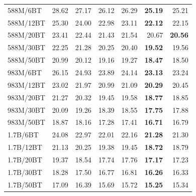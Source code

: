\begin{table}[t]
{\begin{tabular}{lrrrrrr}
    \midrule
    588M/6BT & 28.62 & 27.17 & 26.12 & 26.29 & \textbf{25.19} & 25.21 \\
    588M/12BT & 25.30 & 24.00 & 22.98 & 23.11 & \textbf{22.12} & 22.15 \\
    588M/20BT & 23.41 & 22.44 & 21.43 & 21.54 & 20.67 & \textbf{20.56} \\
    588M/30BT & 22.25 & 21.28 & 20.25 & 20.40 & \textbf{19.52} & 19.56 \\
    588M/50BT & 20.99 & 20.12 & 19.16 & 19.27 & \textbf{18.47} & 18.50 \\
    \midrule
    983M/6BT & 26.15 & 24.93 & 23.89 & 24.14 & \textbf{23.13} & 23.24 \\
    983M/12BT & 23.02 & 21.97 & 20.99 & 21.09 & \textbf{20.29} & 20.45 \\
    983M/20BT & 21.27 & 20.32 & 19.45 & 19.58 & \textbf{18.77} & 18.85 \\
    983M/30BT & 20.09 & 19.26 & 18.39 & 18.55 & \textbf{17.75} & 17.88 \\
    983M/50BT & 18.87 & 18.16 & 17.28 & 17.41 & \textbf{16.71} & 16.79 \\
    \midrule
    1.7B/6BT & 24.08 & 22.97 & 22.01 & 22.16 & \textbf{21.28} & 21.30 \\
    1.7B/12BT & 21.13 & 20.25 & 19.38 & 19.45 & \textbf{18.72} & 18.79 \\
    1.7B/20BT & 19.37 & 18.54 & 17.74 & 17.76 & \textbf{17.17} & 17.23 \\
    1.7B/30BT & 18.28 & 17.50 & 16.77 & 16.81 & \textbf{16.26} & 16.33 \\
    1.7B/50BT & 17.09 & 16.39 & 15.69 & 15.72 & \textbf{15.25} & 15.34 \\
    \bottomrule
  \end{tabular}%
  }
\end{table}
